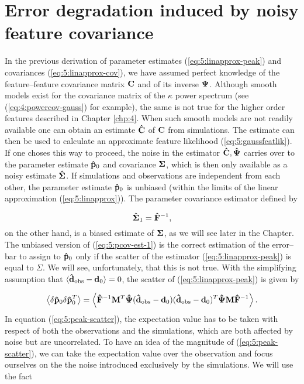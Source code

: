 \section{Error degradation induced by noisy feature covariance}
\label{sec:5:degrade}
In the previous derivation of parameter estimates (\ref{eq:5:linapprox-peak}) and covariances (\ref{eq:5:linapprox-cov}), we have assumed perfect knowledge of the feature--feature covariance matrix $\mathbf{C}$ and of its inverse $\mathbf{\Psi}$. Although smooth models exist for the covariance matrix of the $\kappa$ power spectrum (see (\ref{eq:4:powercov-gauss}) for example), the same is not true for the higher order features described in Chapter \ref{chp:4}. When such smooth models are not readily available one can obtain an estimate $\mathbf{\hat{C}}$ of $\mathbf{C}$ from simulations. The estimate can then be used to calculate an approximate feature likelihood (\ref{eq:5:gaussfeatlik}). If one choses this way to proceed, the noise in the estimator $\mathbf{\hat{C}},\mathbf{\hat{\Psi}}$ carries over to the parameter estimate $\mathbf{\hat{p}}_0$ and covariance $\mathbf{\Sigma}$, which is then only available as a noisy estimate $\mathbf{\hat{\Sigma}}$. If simulations and observations are independent from each other, the parameter estimate $\mathbf{\hat{p}}_0$ is unbiased (within the limits of the linear approximation (\ref{eq:5:linapprox})). The parameter covariance estimator defined by

\begin{equation}
\label{eq:5:pcov-est-1}
\mathbf{\hat{\Sigma}}_1 = \mathbf{\hat{F}}^{-1},
\end{equation}
%
on the other hand, is a biased estimate of $\mathbf{\Sigma}$, as we will see later in the Chapter. The unbiased version of (\ref{eq:5:pcov-est-1}) is the correct estimation of the error--bar to assign to $\mathbf{\hat{p}}_0$ only if the scatter of the estimator (\ref{eq:5:linapprox-peak}) is equal to $\Sigma$. We will see, unfortunately, that this is not true. With the simplifying assumption that $\langle\mathbf{\hat{d}}_{\rm obs}-\mathbf{d}_0\rangle=0$, the scatter of (\ref{eq:5:linapprox-peak}) is given by

\begin{equation}
\label{eq:5:peak-scatter}
\left\langle\delta\mathbf{\hat{p}}_0\delta\mathbf{\hat{p}}_0^T\right\rangle = \left\langle\mathbf{\hat{F}}^{-1}\mathbf{M}^T\mathbf{\hat{\Psi}}(\mathbf{\hat{d}}_{\rm obs}-\mathbf{d}_0)(\mathbf{\hat{d}}_{\rm obs}-\mathbf{d}_0)^T\mathbf{\hat{\Psi}}\mathbf{M}\mathbf{\hat{F}}^{-1}\right\rangle.
\end{equation}
%
In equation (\ref{eq:5:peak-scatter}), the expectation value has to be taken with respect of both the observations and the simulations, which are both affected by noise but are uncorrelated. To have an idea of the magnitude of (\ref{eq:5:peak-scatter}), we can take the expectation value over the observation and focus ourselves on the the noise introduced exclusively by the simulations. We will use the fact

